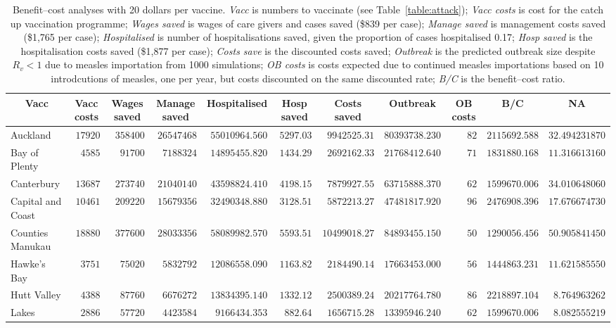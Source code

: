 \documentclass{article}
\begin{document}
\begin{table}\small
\caption{Benefit--cost analyses with 20 dollars per vaccine. \textit{Vacc} is numbers to vaccinate (see Table~\autoref{table:attack}); \textit{Vacc costs} is cost for the catch up vaccination programme; \textit{Wages saved} is wages of care givers and cases saved (\$839 per case); \textit{Manage saved} is management costs saved (\$1,765 per case); \textit{Hospitalised} is number of hospitalisations saved, given the proportion of cases hospitalised 0.17; \textit{Hosp saved} is the hospitalisation costs saved (\$1,877 per case); \textit{Costs save}	is the discounted costs saved; \textit{Outbreak}	is the predicted outbreak size despite $R_v < 1$ due to measles importation from 1000 simulations; \textit{OB costs}	is costs expected due to continued measles importations based on 10 introdcutions of measles, one per year, but costs discounted on the same discounted rate; \textit{B/C} is the benefit--cost ratio.}
\begin{center}
\begin{tabular}{lrrrrrrrrrr}
\hline\hline
\multicolumn{1}{c}{Vacc}&\multicolumn{1}{c}{Vacc costs}&\multicolumn{1}{c}{Wages saved}&\multicolumn{1}{c}{Manage saved}&\multicolumn{1}{c}{Hospitalised}&\multicolumn{1}{c}{Hosp saved}&\multicolumn{1}{c}{Costs saved}&\multicolumn{1}{c}{Outbreak}&\multicolumn{1}{c}{OB costs}&\multicolumn{1}{c}{B/C}&\multicolumn{1}{c}{NA}\tabularnewline
\hline
Auckland&$17920$&$358400$&$26547468$&$55010964.560$&$5297.03$&$ 9942525.31$&$80393738.230$&$ 82$&$2115692.588$&$32.494231870$\tabularnewline
Bay of Plenty&$ 4585$&$ 91700$&$ 7188324$&$14895455.820$&$1434.29$&$ 2692162.33$&$21768412.640$&$ 71$&$1831880.168$&$11.316613160$\tabularnewline
Canterbury&$13687$&$273740$&$21040140$&$43598824.410$&$4198.15$&$ 7879927.55$&$63715888.370$&$ 62$&$1599670.006$&$34.010648060$\tabularnewline
Capital and Coast&$10461$&$209220$&$15679356$&$32490348.880$&$3128.51$&$ 5872213.27$&$47481817.920$&$ 96$&$2476908.396$&$17.676674730$\tabularnewline
Counties Manukau&$18880$&$377600$&$28033356$&$58089982.570$&$5593.51$&$10499018.27$&$84893455.150$&$ 50$&$1290056.456$&$50.905841450$\tabularnewline
Hawke's Bay&$ 3751$&$ 75020$&$ 5832792$&$12086558.090$&$1163.82$&$ 2184490.14$&$17663453.000$&$ 56$&$1444863.231$&$11.621585550$\tabularnewline
Hutt Valley&$ 4388$&$ 87760$&$ 6676272$&$13834395.140$&$1332.12$&$ 2500389.24$&$20217764.780$&$ 86$&$2218897.104$&$ 8.764963262$\tabularnewline
Lakes&$ 2886$&$ 57720$&$ 4423584$&$ 9166434.353$&$ 882.64$&$ 1656715.28$&$13395946.240$&$ 62$&$1599670.006$&$ 8.082555219$\tabularnewline

\end{tabular}
\end{center}
\end{table}
\end{document}
